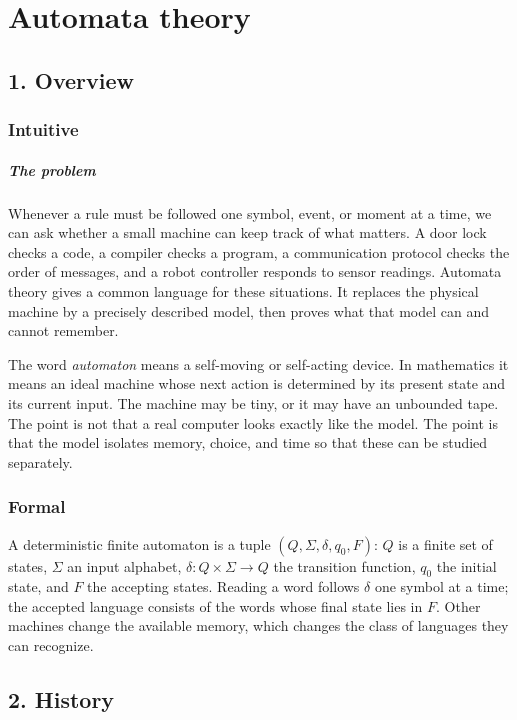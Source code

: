 \clearpage\chapter{Automata theory}
\section*{1. Overview}
\subsection*{Intuitive}
\paragraph{The problem}

Whenever a rule must be followed one symbol, event, or moment at a time, we can ask whether a small machine can keep track of what matters. A door lock checks a code, a compiler checks a program, a communication protocol checks the order of messages, and a robot controller responds to sensor readings. Automata theory gives a common language for these situations. It replaces the physical machine by a precisely described model, then proves what that model can and cannot remember.


The word \emph{automaton} means a self-moving or self-acting device. In mathematics it means an ideal machine whose next action is determined by its present state and its current input. The machine may be tiny, or it may have an unbounded tape. The point is not that a real computer looks exactly like the model. The point is that the model isolates memory, choice, and time so that these can be studied separately.


\subsection*{Formal}
A deterministic finite automaton is a tuple $(Q,\Sigma,\delta,q_0,F)$: $Q$ is a finite set of states, $\Sigma$ an input alphabet, $\delta:Q\times\Sigma\to Q$ the transition function, $q_0$ the initial state, and $F$ the accepting states. Reading a word follows $\delta$ one symbol at a time; the accepted language consists of the words whose final state lies in $F$. Other machines change the available memory, which changes the class of languages they can recognize.
\section*{2. History}
